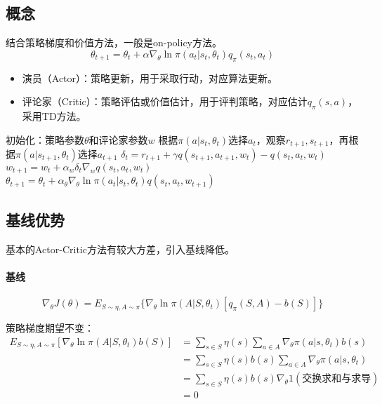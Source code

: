 \documentclass[
12pt, %
a4paper, 
oneside, %
headinclude,footinclude, %
]{scrartcl}
\begin{document}
\subsection[概念]{概念}
结合策略梯度和价值方法，一般是on-policy方法。
$$ \theta_{t + 1} = \theta_t + \alpha \nabla_\theta \ln \pi(a_t|s_t, \theta_t) q_\pi(s_t, a_t) $$
\begin{itemize}
\item 演员（Actor）：策略更新，用于采取行动，对应算法更新。
\item 评论家（Critic）：策略评估或价值估计，用于评判策略，对应估计$ q_{\pi}(s, a) $，采用TD方法。
\end{itemize}
\begin{myalgorithm}[QAC]
\State 初始化：策略参数$ \theta $和评论家参数$ w $
\State 根据$ \pi(a|s_t, \theta_t) $选择$ a_t $，观察$ r_{t + 1}, s_{t + 1} $，再根据$ \pi(a|s_{t + 1}, \theta_t) $选择$ a_{t + 1} $
\State $ \delta_t = r_{t + 1} + \gamma q(s_{t + 1}, a_{t + 1}, w_t) - q(s_t, a_t, w_t) $ 
\State $ w_{t + 1} = w_t + \alpha_w \delta_t \nabla_w q(s_t, a_t, w_t) $ 
\State $ \theta_{t + 1} = \theta_t + \alpha_\theta \nabla_\theta \ln \pi(a_t|s_t, \theta_t) q(s_t, a_t, w_{t + 1}) $ 
\EndFor
\EndFor
\end{myalgorithm}
\subsection[基线优势]{基线优势}
基本的Actor-Critic方法有较大方差，引入基线降低。
\paragraph{基线}
$$ \nabla_\theta J(\theta) = E_{S \sim \eta, A \sim \pi}\{\nabla_\theta \ln \pi(A|S, \theta_t) [q_\pi(S, A) - b(S)]\} $$

策略梯度期望不变：
\begin{align*}
E_{S \sim \eta, A \sim \pi}[\nabla_\theta \ln \pi(A|S, \theta_t)b(S)] &= \sum_{s \in S} \eta(s) \sum_{a \in A} \nabla_\theta \pi(a|s, \theta_t)b(s) \\
&= \sum_{s \in S} \eta(s) b(s) \sum_{a \in A} \nabla_\theta \pi(a|s, \theta_t) \\
&= \sum_{s \in S} \eta(s) b(s) \nabla_\theta 1 (\text{交换求和与求导}) \\
&= 0
\end{align*}
\end{document}
